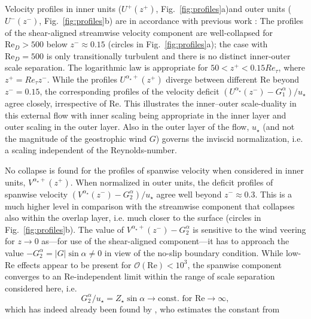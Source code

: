 \documentclass[smallcondensed,final]{svjour3}
\newcommand{\todo}[1]{\textcolor{red}{$[$#1$]$}}
\newcommand{\RE}{\mathrm{Re}}
\begin{document}
%
\par
%
Velocity profiles in inner units ($U^+(z^+)$, Fig.~\ref{fig:profiles}a)and outer units ($U^-(z^-)$, Fig.~\ref{fig:profiles}b)
are in accordance with previous work \citep{coleman:JFM1992,spalart:PF2008,spalart:PF2009,ansorge:BM2014,ansorge:BM2019}:
%
The profiles of the shear-aligned streamwise velocity component are well-collapsed for $\RE_D>500$
below $z^-\approx 0.15$ (circles in Fig.~\ref{fig:profiles}a); the case with $\RE_D=500$ is only transitionally
turbulent and there is no distinct inner-outer scale separation.
The logarithmic law is appropriate for $50 < z^+ < 0.15 Re_\tau$, where $z^+ = Re_\tau z^-$.
%
While the profiles $U^{\alpha_\star+}(z^+)$ diverge between different $\RE$ beyond $z^-=0.15$,
the corresponding profiles of the velocity deficit  $(U^{\alpha_\star}(z^-) - G_{1}^{\alpha} ) /u_\star$
agree closely, irrespective of $\RE$.
%
This illustrates the inner--outer scale-duality in this external flow with inner scaling being
appropriate in the inner layer and outer scaling in the outer layer. 
%
Also in the outer layer of the flow, $u_\star$ (and not the magnitude of the
geostrophic wind $G$) governs the inviscid normalization, i.e. a scaling independent of the Reynolds-number.
%
\par
%
No collapse is found for the profiles of spanwise velocity when considered in inner units, $V^{\alpha_\star+}(z^+)$. 
%
When normalized in outer units, the deficit profiles of spanwise velocity
$(V^{\alpha_\star}(z^-)-G_{2}^{\alpha})/u_\star$
agree well beyond $z^-\approx 0.3$. %
This is a much higher level in comparison with the streamwise component that collapses
also within the overlap layer, i.e. much closer to the surface
(circles in Fig.~\ref{fig:profiles}b).
%
The value of $V^{\alpha_\star+}(z^-)-G_{2}^{\alpha}$ is sensitive to the wind veering for
$z\rightarrow 0$ as---for use of the shear-aligned component---it has to approach the value
$-G_2^\alpha=|G|\sin\alpha\ne0$ in view of the no-slip boundary condition.  
%
While low-$\RE$ effects appear to be present for $\mathcal{O}(\RE)<10^3$, the spanwise component
converges to an $\RE$-independent limit within the range of scale separation considered
here, i.e.
\begin{equation}
  G_{2}^{\alpha}/u_\star = Z_\star \sin\alpha \rightarrow \text{const. for\ }\RE\rightarrow \infty, 
\end{equation}
which has indeed already been found by \cite{spalart:JFM1989}, who estimates the constant from
\end{document}
